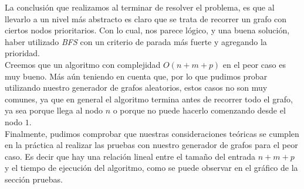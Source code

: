 La conclusión que realizamos al terminar de resolver el problema, es que al llevarlo a un nivel más abstracto es claro que se trata de recorrer un grafo con ciertos nodos prioritarios. Con lo cual, nos parece lógico, y una buena solución, haber utilizado \textit{BFS} con un criterio de parada más fuerte y agregando la prioridad. \\

Creemos que un algoritmo con complejidad $O(n+m+p)$ en el peor caso es muy bueno. Más aún teniendo en cuenta que, por lo que pudimos probar utilizando nuestro generador de grafos aleatorios, estos casos no son muy comunes, ya que en general el algoritmo termina antes de recorrer todo el grafo, ya sea porque llega al nodo $n$ o porque no puede hacerlo comenzando desde el nodo $1$. \\

Finalmente, pudimos comprobar que nuestras consideraciones teóricas se cumplen en la práctica al realizar las pruebas con nuestro generador de grafos para el peor caso. Es decir que hay una relación lineal entre el tamaño del entrada $n+m+p$ y el tiempo de ejecución del algoritmo, como se puede observar en el gráfico de la sección pruebas. \\
